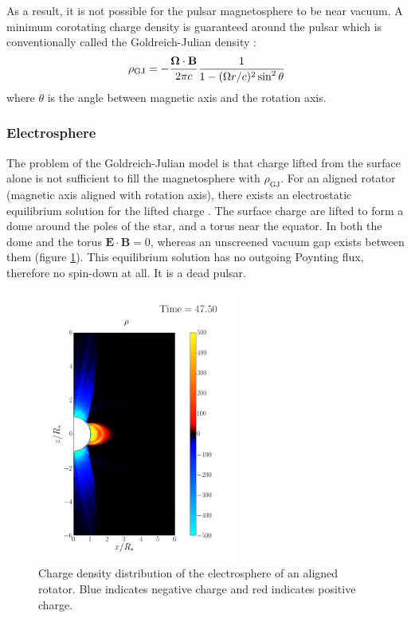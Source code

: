 As a result, it is not possible for the pulsar magnetosphere to be near vacuum.
A minimum corotating charge density is guaranteed around the pulsar which is
conventionally called the Goldreich-Julian density \citep{goldreich_pulsar_1969}:
\begin{equation}
  \label{eq:gj-density}
  \rho_\mathrm{GJ} = -\frac{\bm{\Omega}\cdot \mathbf{B}}{2\pi c}\frac{1}{1 - (\Omega r/c)^2\sin^{2}\theta}
\end{equation}
where $\theta$ is the angle between magnetic axis and the rotation axis.

\subsubsection{Electrosphere}
\label{sec:electrosphere}

The problem of the Goldreich-Julian model is that charge lifted from the
surface alone is not sufficient to fill the magnetosphere with
$\rho_\mathrm{GJ}$. For an aligned rotator (magnetic axis aligned with rotation
axis), there exists an electrostatic equilibrium solution for the lifted charge
\citep{jackson_new_1976, krause-polstorff_pulsar_1985,
  krause-polstorff_electrosphere_1985}. The surface charge are lifted to form a
dome around the poles of the star, and a torus near the equator. In both the
dome and the torus $\mathbf{E}\cdot \mathbf{B} = 0$, whereas an unscreened
vacuum gap exists between them (figure \ref{fig:electrosphere-intro}). This
equilibrium solution has no outgoing Poynting flux, therefore no spin-down at
all. It is a dead pulsar.

\begin{figure}[h]
  \centering
  \includegraphics[width=0.6\textwidth]{pics/intro/electrosphere-new.png}
  \caption[Charge density distribution of the electrosphere of an aligned
  rotator.]{Charge density distribution of the electrosphere of an aligned
    rotator. Blue indicates negative charge and red indicates positive charge.}
  \label{fig:electrosphere-intro}
\end{figure}

